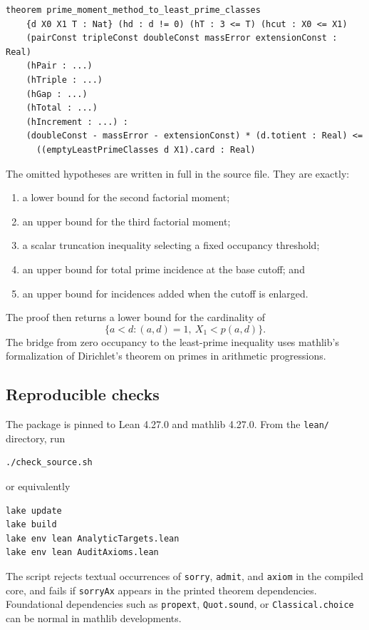 \documentclass[11pt]{article}
\theoremstyle{definition}
\theoremstyle{remark}
\begin{document}
\begin{lstlisting}
theorem prime_moment_method_to_least_prime_classes
    {d X0 X1 T : Nat} (hd : d != 0) (hT : 3 <= T) (hcut : X0 <= X1)
    (pairConst tripleConst doubleConst massError extensionConst : Real)
    (hPair : ...)
    (hTriple : ...)
    (hGap : ...)
    (hTotal : ...)
    (hIncrement : ...) :
    (doubleConst - massError - extensionConst) * (d.totient : Real) <=
      ((emptyLeastPrimeClasses d X1).card : Real)
\end{lstlisting}

The omitted hypotheses are written in full in the source file. They are exactly:
\begin{enumerate}[leftmargin=2.2em]
  \item a lower bound for the second factorial moment;
  \item an upper bound for the third factorial moment;
  \item a scalar truncation inequality selecting a fixed occupancy threshold;
  \item an upper bound for total prime incidence at the base cutoff; and
  \item an upper bound for incidences added when the cutoff is enlarged.
\end{enumerate}
The proof then returns a lower bound for the cardinality of
\[
  \{a<d:(a,d)=1,\ X_1<p(a,d)\}.
\]
The bridge from zero occupancy to the least-prime inequality uses mathlib's formalization of Dirichlet's theorem on primes in arithmetic progressions.

\subsection{Reproducible checks}

The package is pinned to Lean 4.27.0 and mathlib 4.27.0.
From the \texttt{lean/} directory, run
\begin{lstlisting}[language=bash]
./check_source.sh
\end{lstlisting}
or equivalently
\begin{lstlisting}[language=bash]
lake update
lake build
lake env lean AnalyticTargets.lean
lake env lean AuditAxioms.lean
\end{lstlisting}
The script rejects textual occurrences of \texttt{sorry}, \texttt{admit}, and \texttt{axiom} in the compiled core, and fails if \texttt{sorryAx} appears in the printed theorem dependencies.
Foundational dependencies such as \texttt{propext}, \texttt{Quot.sound}, or \texttt{Classical.choice} can be normal in mathlib developments.
\end{document}
